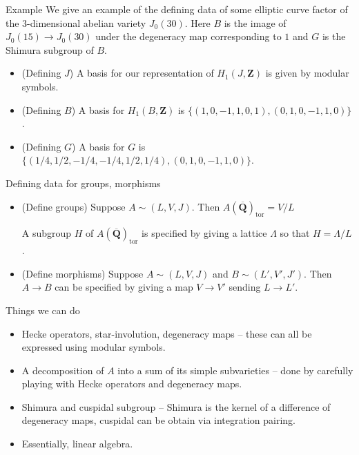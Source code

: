 \documentclass{beamer}
\newcommand{\QQbar}{\overline{\mathbf{Q}}}
\newcommand{\ZZ}{\mathbf{Z}}
\renewcommand{\ZZ}{\mathbf{Z}}
\newcommand{\tor}{\mathrm{tor}}
\begin{document}
\begin{frame}{Example}
    We give an example of the defining data of some elliptic curve factor of
    the 3-dimensional abelian variety $J_0(30)$. Here $B$ is the image of
    $J_0(15)\to J_0(30)$ under the degeneracy map corresponding to $1$ and $G$
    is the Shimura subgroup of $B$.
    \begin{itemize}
        \item
            (Defining $J$) A basis for our representation of $H_1(J, \ZZ)$ is
            given by modular symbols.
        \item
            (Defining $B$) A basis for $H_1(B, \ZZ)$ is $\{(1,0,-1,1,0,1),
            (0,1,0,-1,1,0)\}$.
        \item
            (Defining $G$) A basis for $G$ is $\{(1/4, 1/2, -1/4, -1/4, 1/2,
            1/4), (0,1,0,-1,1,0)\}$.
    \end{itemize}
\end{frame}

\begin{frame}{Defining data for groups, morphisms}
    \begin{itemize}
        \item
            (Define groups) Suppose $A\sim (L, V, J)$. Then
            $A(\QQbar)_\tor=V/L$

            A subgroup $H$ of
            $A(\QQbar)_\tor$ is specified by giving a lattice $\Lambda$ so that
            $H = \Lambda/L$.
        \item
            (Define morphisms) Suppose $A\sim (L, V, J)$ and $B\sim (L', V', J')$.
            Then $A\to B$ can be specified by giving a map $V\to V'$ sending
            $L\to L'$.
    \end{itemize}
\end{frame}

\begin{frame}{Things we can do}
    \begin{itemize}
        \item
            Hecke operators, star-involution, degeneracy maps -- these can all
            be expressed using modular symbols.
        \item
            A decomposition of $A$ into a sum of its simple subvarieties --
            done by carefully playing with Hecke operators and degeneracy maps.
        \item
            Shimura and cuspidal subgroup -- Shimura is the kernel of a
            difference of degeneracy maps, cuspidal can be obtain via
            integration pairing.
        \item
            Essentially, linear algebra.
    \end{itemize}
\end{frame}
\end{document}
